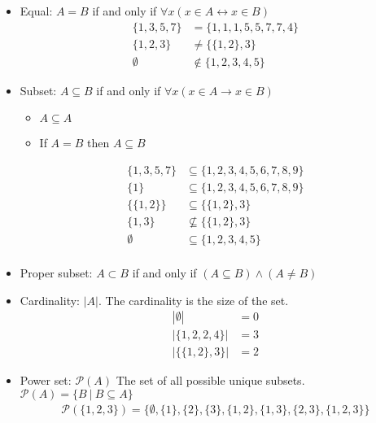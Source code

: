 \documentclass{article}
\theoremstyle{mytheoremstyle}
\theoremstyle{mytheoremstyle}
\theoremstyle{myproblemstyle}
\begin{document}
    \begin{itemize}
        \item Equal: $A=B$ if and only if $\forall x (x\in A \leftrightarrow x
            \in B)$
            \begin{align*}
                \{1,3,5,7\} &= \{1,1,1,5,5,7,7,4\} \\
                \{1,2,3\} &\ne \{\{1,2\},3\} \\
                \emptyset &\not\in \{1,2,3,4,5\}
            \end{align*}

        \item Subset: $A \subseteq B$ if and only if
            $\forall x (x \in A \rightarrow x \in B)$
            \begin{itemize}
                \item $A \subseteq A$
                \item If $A=B$ then $A\subseteq B$
            \end{itemize}
            \begin{align*}
                \{1,3,5,7\} &\subseteq \{1,2,3,4,5,6,7,8,9\} \\
                \{1\} &\subseteq \{1,2,3,4,5,6,7,8,9\} \\
                \{\{1,2\}\} &\subseteq \{\{1,2\},3\} \\
                \{1,3\} &\not\subseteq \{\{1,2\},3\} \\
                \emptyset &\subseteq \{1,2,3,4,5\} \\
            \end{align*}

        \item Proper subset: $A \subset B$ if and only if
            $(A\subseteq B) \wedge (A\ne B)$

        \item Cardinality: $|A|$. The cardinality is the size of the set.
            \begin{align*}
                |\emptyset| &= 0 \\
                |\{1,2,2,4\}| &= 3 \\
                |\{\{1,2\},3\}| &= 2
            \end{align*}

        \item Power set: $\mathcal{P}(A)$ The set of all possible unique subsets.
            $\mathcal{P}(A) = \{B\ |\ B \subseteq A\}$
            \begin{align*}
                \mathcal{P}(\{1,2,3\}) = \{\emptyset,\{1\}, \{2\}, \{3\},
                \{1,2\}, \{1,3\}, \{2,3\}, \{1,2,3\}\}
            \end{align*}


\end{itemize}
\end{document}
